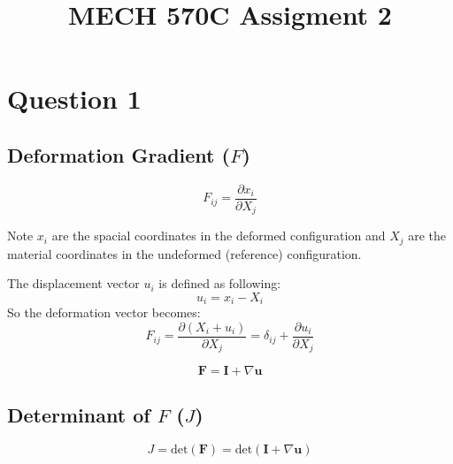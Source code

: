 \documentclass[a4paper,12pt]{article} %
\begin{document}
\setlength{\parskip}{1em} 
\setlength{\parindent}{0pt}
\newcommand{\vect}[1]{\mathbf{#1}}

\title{MECH 570C Assigment 2}

\section{\textbf{Question 1}}


\subsection{Deformation Gradient (\(F\))}

\[ F_{ij} = \frac{\partial x_i}{\partial X_j} \]

Note \(x_i\) are the spacial coordinates in the deformed configuration and \(X_j\) are the material coordinates in the undeformed (reference) configuration.

The displacement vector \(u_i\) is defined as following:
\[ u_i = x_i - X_i \]
So the deformation vector becomes:
\[ F_{ij} = \frac{\partial (X_i + u_i)}{\partial X_j} = \delta_{ij} + \frac{\partial u_i}{\partial X_j} \]

\[ \vect{F} = \vect{I} + \nabla \vect{u} \]


\subsection{Determinant of \(F\) (\(J\))}

\[ J = \text{det}(\vect{F}) = \text{det}(\vect{I} + \nabla \vect{u}) \]
\end{document}
